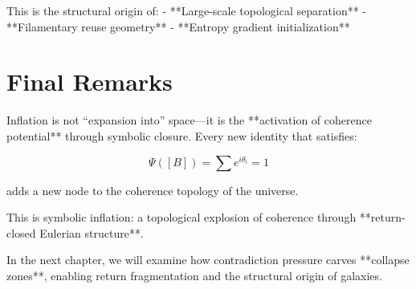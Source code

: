 This is the structural origin of:
- **Large-scale topological separation**
- **Filamentary reuse geometry**
- **Entropy gradient initialization**

\section{Final Remarks}

Inflation is not “expansion into” space—it is the **activation of coherence potential** through symbolic closure. Every new identity that satisfies:

\[
\Psi([B]) = \sum e^{i\theta_i} = 1
\]

adds a new node to the coherence topology of the universe.

This is symbolic inflation: a topological explosion of coherence through **return-closed Eulerian structure**.

In the next chapter, we will examine how contradiction pressure carves **collapse zones**, enabling return fragmentation and the structural origin of galaxies.
